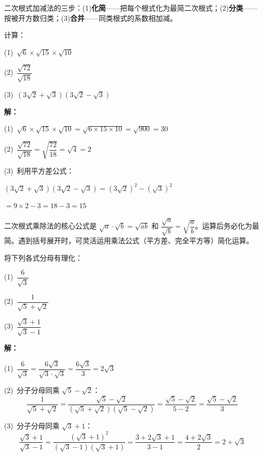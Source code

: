 \documentclass[12pt, a4paper]{ctexart}
\begin{document}
\begin{tipbox}[方法总结]
二次根式加减法的三步：(1)\textbf{化简}——把每个根式化为最简二次根式；(2)\textbf{分类}——按被开方数归类；(3)\textbf{合并}——同类根式的系数相加减。
\end{tipbox}

\begin{examplebox}[【例题4】二次根式的乘除运算]
计算：

\medskip
(1)\ $\sqrt{6} \times \sqrt{15} \times \sqrt{10}$

\medskip
(2)\ $\dfrac{\sqrt{72}}{\sqrt{18}}$

\medskip
(3)\ $(3\sqrt{2} + \sqrt{3})(3\sqrt{2} - \sqrt{3})$

\bigskip
\textbf{解：}

(1)\ $\sqrt{6} \times \sqrt{15} \times \sqrt{10} = \sqrt{6 \times 15 \times 10} = \sqrt{900} = 30$

\medskip
(2)\ $\dfrac{\sqrt{72}}{\sqrt{18}} = \sqrt{\dfrac{72}{18}} = \sqrt{4} = 2$

\medskip
(3)\ 利用平方差公式：

$(3\sqrt{2} + \sqrt{3})(3\sqrt{2} - \sqrt{3}) = (3\sqrt{2})^2 - (\sqrt{3})^2$

$= 9 \times 2 - 3 = 18 - 3 = 15$
\end{examplebox}

\begin{tipbox}[方法总结]
二次根式乘除法的核心公式是 $\sqrt{a} \cdot \sqrt{b} = \sqrt{ab}$ 和 $\dfrac{\sqrt{a}}{\sqrt{b}} = \sqrt{\dfrac{a}{b}}$。运算后务必化为最简。遇到括号展开时，可灵活运用乘法公式（平方差、完全平方等）简化运算。
\end{tipbox}

\begin{examplebox}[【例题5】分母有理化]
将下列各式分母有理化：

\medskip
(1)\ $\dfrac{6}{\sqrt{3}}$

\medskip
(2)\ $\dfrac{1}{\sqrt{5} + \sqrt{2}}$

\medskip
(3)\ $\dfrac{\sqrt{3} + 1}{\sqrt{3} - 1}$

\bigskip
\textbf{解：}

(1)\ $\dfrac{6}{\sqrt{3}} = \dfrac{6\sqrt{3}}{\sqrt{3} \cdot \sqrt{3}} = \dfrac{6\sqrt{3}}{3} = 2\sqrt{3}$

\medskip
(2)\ 分子分母同乘 $\sqrt{5} - \sqrt{2}$：
\[
\frac{1}{\sqrt{5}+\sqrt{2}} = \frac{\sqrt{5}-\sqrt{2}}{(\sqrt{5}+\sqrt{2})(\sqrt{5}-\sqrt{2})} = \frac{\sqrt{5}-\sqrt{2}}{5-2} = \frac{\sqrt{5}-\sqrt{2}}{3}
\]

\medskip
(3)\ 分子分母同乘 $\sqrt{3} + 1$：
\[
\frac{\sqrt{3}+1}{\sqrt{3}-1} = \frac{(\sqrt{3}+1)^2}{(\sqrt{3}-1)(\sqrt{3}+1)} = \frac{3 + 2\sqrt{3} + 1}{3 - 1} = \frac{4 + 2\sqrt{3}}{2} = 2 + \sqrt{3}
\]
\end{examplebox}
\end{document}
